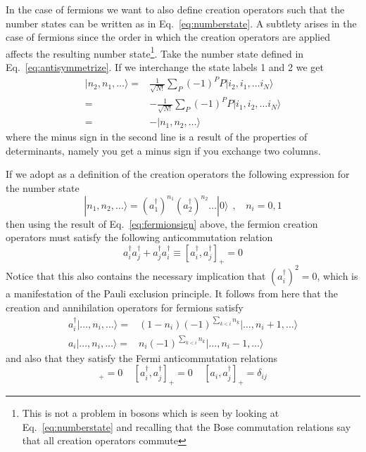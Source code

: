 \documentclass[oneside,11pt]{memoir}
\begin{document}
In the case of fermions we want to also define creation  operators such that
the number states can be written as in Eq.~\ref{eq:numberstate}.    A subtlety
arises in the case of fermions since  the order in which the creation operators
are applied affects the resulting number state\footnote{This is not a problem
in bosons which is seen by looking at Eq.~\ref{eq:numberstate} and recalling
that the Bose commutation relations say that all creation operators commute}.
Take the number state defined in Eq.~\ref{eq:antisymmetrize}.  If we
interchange the state labels 1 and 2 we get 
\begin{equation}
\begin{split}
  | n_{2},  n_{1}, \ldots \rangle = &
  \frac{1}{\sqrt{N!}} \sum_{P} (- 1)^{P} P | i_{2},  i_{1}, \ldots i_{N} \rangle \\
   = & -
  \frac{1}{\sqrt{N!}} \sum_{P} (- 1)^{P} P | i_{1},  i_{2}, \ldots i_{N} \rangle \\ 
   = & -
  | n_{1},  n_{2}, \ldots \rangle 
\end{split}
\label{eq:fermionsign}
\end{equation} 
where the minus sign in the second line is a result of the properties of
determinants, namely you get a minus sign if you exchange two columns. 

If we adopt as a definition of the creation operators the following expression
for the number state \begin{equation}
  | n_{1}, n_{2}, \dots \rangle =  
   ( a_{1}^{\dagger} ) ^{n_{1}}  
   ( a_{2}^{\dagger} ) ^{n_{2}}  \ldots | 0 \rangle \ \ , \ \ \ \ n_{i}=0,1 
  \label{eq:numberstateFermions}
\end{equation}
then using the result of Eq.~\ref{eq:fermionsign} above, the fermion creation
operators must satisfy the following anticommutation relation 
\begin{equation}
 a_{i}^{\dagger}a_{j}^{\dagger} + a_{j}^{\dagger}a_{i}^{\dagger} 
  \equiv [a_{i}^{\dagger}, a_{j}^{\dagger}]_{+} = 0 
\end{equation}
Notice that this also contains the necessary implication that
$(a_{i}^{\dagger})^{2}=0$, which is a manifestation of the Pauli exclusion
principle.  It follows from here that the creation and annihilation operators
for fermions satisfy \begin{equation}
\begin{split}
  a_{i}^{\dagger}| \ldots, n_{i}, \ldots \rangle 
  =  & (1-n_{i})(-1)^{\sum_{k<i} n_{k}} | \ldots, n_{i}+1, \ldots \rangle \\
  a_{i}| \ldots, n_{i}, \ldots \rangle 
  =  & n_{i}(-1)^{\sum_{k<i} n_{k}} | \ldots, n_{i}-1, \ldots \rangle
\end{split} 
\end{equation}
and also that they satisfy the Fermi anticommutation relations 
\begin{equation}
  [a_{i}, a_{j}]_{+} = 0 \ \ \ \ \  
  [a_{i}^{\dagger}, a_{j}^{\dagger}]_{+} = 0 \ \ \ \ \   
  [a_{i},a_{j}^{\dagger}]_{+}=\delta_{ij}
\end{equation}
\end{document}
